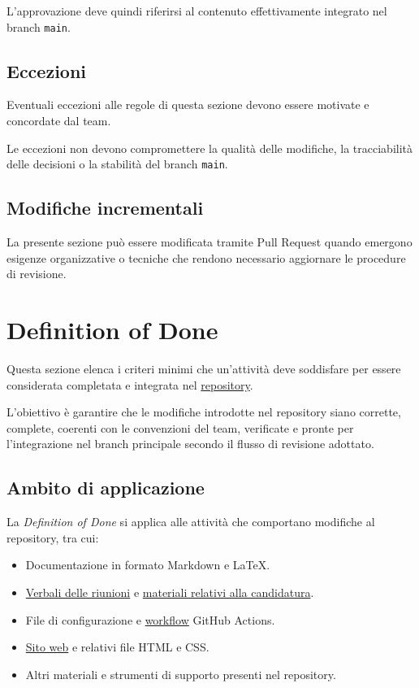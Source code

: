 \documentclass[11pt, a4paper]{article}
\begin{document}
L'approvazione deve quindi riferirsi al contenuto effettivamente integrato nel branch \texttt{main}.

\subsection{Eccezioni}

Eventuali eccezioni alle regole di questa sezione devono essere motivate e concordate dal team.

Le eccezioni non devono compromettere la qualità delle modifiche, la tracciabilità delle decisioni o la stabilità del branch \texttt{main}.

\subsection{Modifiche incrementali}

La presente sezione può essere modificata tramite Pull Request quando emergono esigenze organizzative o tecniche che rendono necessario aggiornare le procedure di revisione.

\section{Definition of Done}
\label{sec:definition-of-done}

Questa sezione elenca i criteri minimi che un'attività deve soddisfare per essere considerata completata e integrata nel \href{https://github.com/On-By-One-Team/On-By-One.github.io}{repository}.

L'obiettivo è garantire che le modifiche introdotte nel repository siano corrette, complete, coerenti con le convenzioni del team, verificate e pronte per l'integrazione nel branch principale secondo il flusso di revisione adottato.

\subsection{Ambito di applicazione}

La \textit{Definition of Done} si applica alle attività che comportano modifiche al repository, tra cui:
\begin{itemize}
    \item Documentazione in formato Markdown e LaTeX.
    \item \href{https://github.com/On-By-One-Team/On-By-One.github.io/tree/main/docs/pdf/verbali}{Verbali delle riunioni} e \href{https://github.com/On-By-One-Team/On-By-One.github.io/tree/main/docs/pdf/candidatura}{materiali relativi alla candidatura}.
    \item File di configurazione e \href{https://github.com/On-By-One-Team/On-By-One.github.io/tree/main/.github/workflows}{workflow} GitHub Actions.
    \item \href{https://on-by-one-team.github.io/On-By-One.github.io/}{Sito web} e relativi file HTML e CSS.
    \item Altri materiali e strumenti di supporto presenti nel repository.
\end{itemize}
\end{document}
